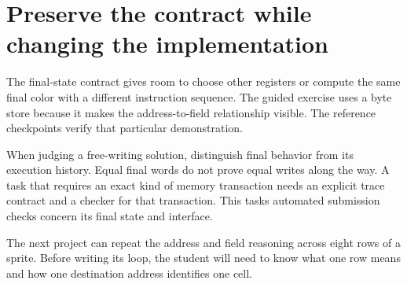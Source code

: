 \section{Preserve the contract while changing the
  implementation}\label{002-single-pixel-p08-preserve-the-contract-while-changing-the-implementation}

The final-state contract gives room to choose other registers or compute
the same final color with a different instruction sequence. The guided
exercise uses a byte store because it makes the address-to-field
relationship visible. The reference checkpoints verify that particular
demonstration.

When judging a free-writing solution, distinguish final behavior from
its execution history. Equal final words do not prove equal writes along
the way. A task that requires an exact kind of memory transaction needs
an explicit trace contract and a checker for that transaction. This
task\textquotesingle s automated submission checks concern its final
state and interface.

The next project can repeat the address and field reasoning across eight
rows of a sprite. Before writing its loop, the student will need to know
what one row means and how one destination address identifies one cell.

